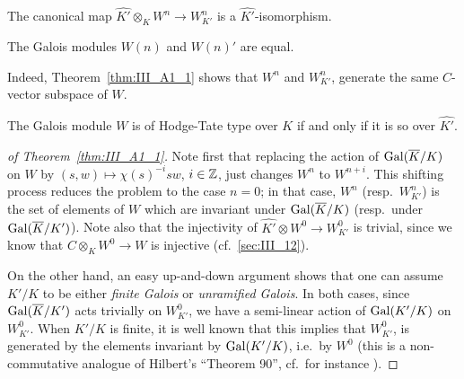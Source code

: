 \begin{subappendices}
\begin{thm}\label{thm:III_A1_1}
	The canonical map $\widehat{K'} \otimes_K W^n \to W^n_{K'}$ is a
	$\widehat{K'}$-isomorphism.
\end{thm}
\begin{cor}
	The Galois modules $W(n)$ and $W(n)'$ are equal.
	\dpage
\end{cor}
Indeed, Theorem~\ref{thm:III_A1_1} shows that $W^n$ and $W^n_{K'}$, generate
the same $C$-vector subspace of $W$.

\begin{cor}\label{cor:III_A1_12}
	The Galois module $W$ is of Hodge-Tate type over $K$ if and only if it
	is so over $\widehat{K'}$.
\end{cor}
\begin{proof}[ of Theorem~\ref{thm:III_A1_1}]
	Note first that replacing the action of $\operatorname{Gal}(\overline{K}/K)$ on $W$ by
	$(s,w) \mapsto \chi(s)^{-i}sw$, $i \in \mathbb{Z}$, just changes $W^n$ to
	$W^{n+i}$. This shifting process reduces the problem to the case $n =
	0$; in that case, $W^n$ (resp.\ $W^n_{K'}$) is the set of elements of
	$W$ which are invariant under $\operatorname{Gal}(\overline{K}/K)$ (resp.\ under
	$\operatorname{Gal}(\overline{K}/K')$). Note also that the injectivity of $\widehat{K'}
	\otimes W^0 \to W^0_{K'}$ is trivial, since we know that $C \otimes_K
	W^0 \to W$ is injective (cf.\ \ref{sec:III_12}).

	On the other hand, an easy up-and-down argument shows that one can
	assume $K'/K$ to be either \emph{finite Galois} or \emph{unramified
	Galois}. In both cases, since $\operatorname{Gal}(\overline{K}/K')$ acts trivially on
	$W^0_{K'}$, we have a semi-linear action of $\operatorname{Gal}(K'/K)$ on $W_{K'}^0$.
	When $K'/K$ is finite, it is well known that this implies that
	$W_{K'}^0$, is generated by the elements invariant by $\operatorname{Gal}(K'/K)$,
	i.e.\ by $W^0$ (this is a non-commutative analogue of Hilbert's
	``Theorem 90'', cf.\ for instance \cite[159]{29}).


\end{proof}
\end{subappendices}
